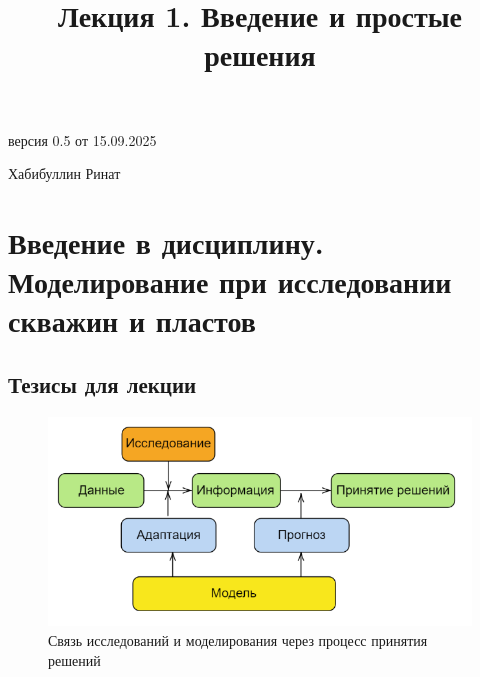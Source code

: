 \documentclass[
  russian,
  letterpaper,
  DIV=11,
  numbers=noendperiod,
  oneside]{scrartcl}
\title{Лекция 1. Введение и простые решения}
\author{}
\date{}
\renewcommand*\contentsname{Содержание}
\newcommand\contentsname{Содержание}
\begin{document}
\maketitle

\renewcommand*\contentsname{Содержание}
{
\hypersetup{linkcolor=}
\setcounter{tocdepth}{3}
\tableofcontents
}

версия 0.5 от 15.09.2025

Хабибуллин Ринат

\section{Введение в дисциплину. Моделирование при исследовании скважин и
пластов}\label{ux432ux432ux435ux434ux435ux43dux438ux435-ux432-ux434ux438ux441ux446ux438ux43fux43bux438ux43dux443.-ux43cux43eux434ux435ux43bux438ux440ux43eux432ux430ux43dux438ux435-ux43fux440ux438-ux438ux441ux441ux43bux435ux434ux43eux432ux430ux43dux438ux438-ux441ux43aux432ux430ux436ux438ux43d-ux438-ux43fux43bux430ux441ux442ux43eux432}

\subsection{Тезисы для
лекции}\label{ux442ux435ux437ux438ux441ux44b-ux434ux43bux44f-ux43bux435ux43aux446ux438ux438}

\begin{figure}[H]

{\centering \includegraphics[width=6.25in,height=\textheight,keepaspectratio]{images/image.png}

}

\caption{Связь исследований и моделирования через процесс принятия
решений}

\end{figure}%
\end{document}
